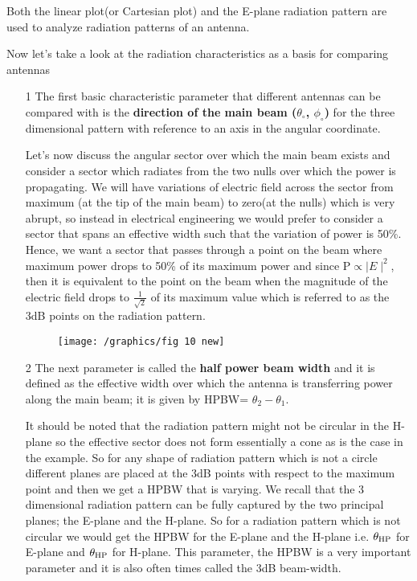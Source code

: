 Both the linear plot(or Cartesian plot) and the E-plane radiation pattern are used to analyze radiation patterns of an antenna.

Now let's take a look at the radiation characteristics as a basis for comparing antennas
\begin{enumerate}
\item[1]The first basic characteristic parameter that different antennas can be compared with is the \textbf{direction of the main beam ($\theta_\circ$, $\phi_\circ$)} for the three dimensional pattern with reference to an axis in the angular coordinate.

Let's now discuss the angular sector over which the main beam exists and consider a sector which radiates from the two nulls over which the power is propagating. We will have variations of electric field across the sector from maximum (at the tip of the main beam) to zero(at the nulls) which is very abrupt, so instead in electrical engineering we would prefer to consider a sector that spans an effective width such that the variation of power is 50\%. Hence, we want a sector that passes through a point on the beam where maximum power drops to 50\% of its maximum power and since P$\propto \mid E\mid^{2}$, then it is equivalent to the point on the beam when the magnitude of the electric field drops to $\frac{1}{\sqrt{2}}$ of its maximum value which is referred to as the 3dB points on the radiation pattern.

\begin{figure}[h]
\centering
\texttt{[image: /graphics/fig 10 new]}
\label{figure10}
\end{figure}
\item[2]The next parameter is called the \textbf{half power beam width} and it is defined as the effective width over which the antenna is transferring power along the main beam; it is given by HPBW= $\theta_2 -\theta_1$.

It should be noted that the radiation pattern might not be circular in the H-plane so the effective sector does not form essentially a cone as is the case in the example. So for any shape of radiation pattern which is not a circle different planes are placed at the 3dB points with respect to the maximum point and then we get a HPBW that is varying. We recall that the 3 dimensional radiation pattern can be fully captured by the two principal planes; the E-plane and the H-plane. So for a radiation pattern which is not circular we would get the HPBW for the E-plane and the H-plane i.e. $\theta_{\textnormal{HP}}$ for E-plane and $\theta_{\textnormal{HP}}$ for H-plane. This parameter, the HPBW is a very important parameter and it is also often times called the 3dB beam-width.  


\end{enumerate}
